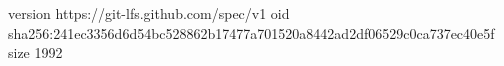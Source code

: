 version https://git-lfs.github.com/spec/v1
oid sha256:241ec3356d6d54bc528862b17477a701520a8442ad2df06529c0ca737ec40e5f
size 1992
